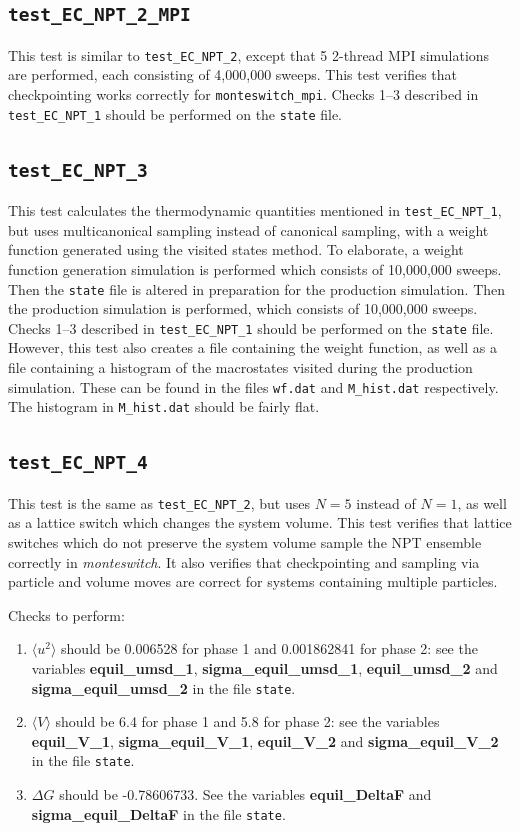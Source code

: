 \documentclass{report}
\begin{document}
\subsection{\texttt{test\_EC\_NPT\_2\_MPI}}
This test is similar to \texttt{test\_EC\_NPT\_2}, except that 5 2-thread MPI simulations are performed, each consisting of
4,000,000 sweeps. This test verifies that checkpointing works correctly for \texttt{monteswitch\_mpi}. 
Checks 1--3 described in \texttt{test\_EC\_NPT\_1} should be performed on the \texttt{state} file.


\subsection{\texttt{test\_EC\_NPT\_3}}
This test calculates the thermodynamic quantities mentioned in \texttt{test\_EC\_NPT\_1}, but uses multicanonical sampling
instead of canonical sampling, with a weight function generated using the visited states method. To elaborate, a weight function generation 
simulation is performed which consists of 10,000,000 sweeps. Then the \texttt{state} file is altered in preparation 
for the production simulation. Then the production simulation is performed, which consists of 10,000,000 sweeps.
Checks 1--3 described in \texttt{test\_EC\_NPT\_1} should be performed on the \texttt{state} file. However, this test
also creates a file containing the weight function, as well as a file containing a histogram of 
the macrostates visited during the production simulation. These can be found in the files \texttt{wf.dat} and \texttt{M\_hist.dat}
respectively. The histogram in \texttt{M\_hist.dat} should be fairly flat.


\subsection{\texttt{test\_EC\_NPT\_4}}
This test is the same as \texttt{test\_EC\_NPT\_2}, but uses $N=5$ instead of $N=1$, as well as a lattice switch which changes the system volume.
This test verifies that lattice switches which do not preserve the system volume sample the NPT ensemble correctly in \emph{monteswitch}. It also 
verifies that checkpointing and sampling via particle and volume moves are correct for systems containing multiple particles.

Checks to perform:
\begin{enumerate}
\item
$\langle u^2\rangle$ should be 0.006528 for phase 1 and 0.001862841 for phase 2: see the 
variables \textbf{equil\_umsd\_1}, \textbf{sigma\_equil\_umsd\_1}, \textbf{equil\_umsd\_2} and \textbf{sigma\_equil\_umsd\_2} 
in the file \texttt{state}.
\item
$\langle V\rangle$ should be 6.4 for phase 1 and 5.8 for phase 2: see the variables \textbf{equil\_V\_1}, 
\textbf{sigma\_equil\_V\_1}, \textbf{equil\_V\_2} and \textbf{sigma\_equil\_V\_2} in the file \texttt{state}.
\item
$\Delta G$ should be -0.78606733. See the variables \textbf{equil\_DeltaF} and \textbf{sigma\_equil\_DeltaF} in the file \texttt{state}.
\end{enumerate}
\end{document}
